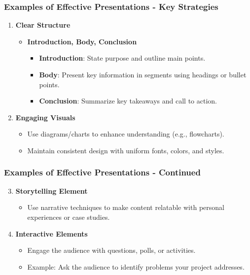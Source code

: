 \documentclass[aspectratio=169]{beamer}
\begin{document}
\begin{frame}[fragile]
    \frametitle{Examples of Effective Presentations - Key Strategies}
    \begin{enumerate}
        \item \textbf{Clear Structure}
            \begin{itemize}
                \item \textbf{Introduction, Body, Conclusion}
                \begin{itemize}
                    \item \textbf{Introduction}: State purpose and outline main points.
                    \item \textbf{Body}: Present key information in segments using headings or bullet points.
                    \item \textbf{Conclusion}: Summarize key takeaways and call to action.
                \end{itemize}
            \end{itemize}
        \item \textbf{Engaging Visuals}
            \begin{itemize}
                \item Use diagrams/charts to enhance understanding (e.g., flowcharts).
                \item Maintain consistent design with uniform fonts, colors, and styles.
            \end{itemize}
    \end{enumerate}
\end{frame}

\begin{frame}[fragile]
    \frametitle{Examples of Effective Presentations - Continued}
    \begin{enumerate}
        \setcounter{enumi}{2} %
        \item \textbf{Storytelling Element}
            \begin{itemize}
                \item Use narrative techniques to make content relatable with personal experiences or case studies.
            \end{itemize}
        \item \textbf{Interactive Elements}
            \begin{itemize}
                \item Engage the audience with questions, polls, or activities.
                \item Example: Ask the audience to identify problems your project addresses.
            \end{itemize}
    \end{enumerate}
\end{frame}
\end{document}
